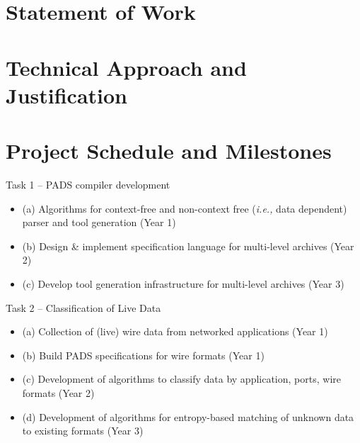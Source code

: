 \documentclass[12pt]{article}
\begin{document}
\section{Statement of Work}



\newpage

\section{Technical Approach and Justification}











%

%

%

%

%



\section{Project Schedule and Milestones}

Task 1 -- PADS compiler development
\begin{itemize}
\item (a) Algorithms for context-free and non-context free ({\em i.e.,} data dependent) parser and tool generation (Year 1)
\item (b) Design \& implement specification language for multi-level archives (Year 2)
\item (c) Develop tool generation infrastructure for multi-level archives (Year 3)
\end{itemize}

\noindent
Task 2 -- Classification of Live Data
\begin{itemize}
\item (a) Collection of (live) wire data from networked applications (Year 1)
\item (b) Build PADS specifications for wire formats (Year 1)
\item (c) Development of algorithms to classify data by application, ports, wire formats (Year 2)
\item (d) Development of algorithms for entropy-based matching of unknown data to existing formats (Year 3)
\end{itemize}
\end{document}
